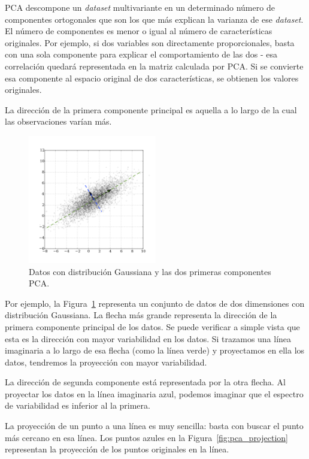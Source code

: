 \documentclass[11pt,spanish,listoffigures,listoftables]{tfgetsinf}
\begin{document}
    PCA descompone un {\em dataset} multivariante en un determinado número de componentes ortogonales que son los que más explican la varianza de ese {\em dataset}. El número de componentes es menor o igual al número de características originales. Por ejemplo, si dos variables son directamente proporcionales, basta con una sola componente para explicar el comportamiento de las dos - esa correlación quedará representada en la matriz calculada por PCA. Si se convierte esa componente al espacio original de dos características, se obtienen los valores originales.
    
    La dirección de la primera componente principal es aquella a lo largo de la cual las observaciones varían más.
    
    \begin{figure}[h]
        \centering
        \includegraphics[width=0.5\textwidth]{GaussianScatterPCA.png}
        \caption{Datos con distribución Gaussiana y las dos primeras componentes PCA.}
        \label{fig:pca1}
    \end{figure}    
   
    Por ejemplo, la Figura~\ref{fig:pca1} representa un conjunto de datos de dos dimensiones con distribución Gaussiana. La flecha más grande representa la dirección de la primera componente principal de los datos. Se puede verificar a simple vista que esta es la dirección con mayor variabilidad en los datos. Si trazamos una línea imaginaria a lo largo de esa flecha (como la línea verde) y proyectamos en ella los datos, tendremos la proyección con mayor variabilidad. 
    
    La dirección de segunda componente está representada por la otra flecha. Al proyectar los datos en la línea imaginaria azul, podemos imaginar que el espectro de variabilidad es inferior al la primera.
   
    La proyección de un punto a una línea es muy sencilla: basta con buscar el punto más cercano en esa línea. Los puntos azules en la Figura~\ref{fig:pca_projection} representan la proyección de los puntos originales en la línea.
\end{document}

